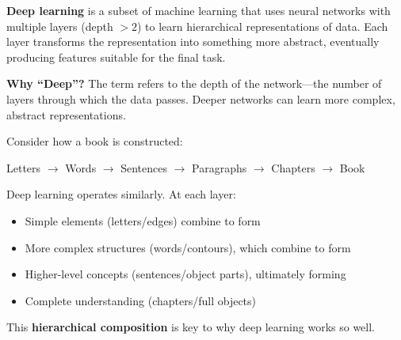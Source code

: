 \begin{center}
\end{center}

\begin{definitionbox}
\textbf{Deep learning} is a subset of machine learning that uses neural networks with multiple layers (depth $> 2$) to learn hierarchical representations of data. Each layer transforms the representation into something more abstract, eventually producing features suitable for the final task.

\textbf{Why ``Deep''?} The term refers to the depth of the network---the number of layers through which the data passes. Deeper networks can learn more complex, abstract representations.
\end{definitionbox}

\begin{bluebox}
Consider how a book is constructed:
\begin{center}
Letters $\rightarrow$ Words $\rightarrow$ Sentences $\rightarrow$ Paragraphs $\rightarrow$ Chapters $\rightarrow$ Book
\end{center}

Deep learning operates similarly. At each layer:
\begin{itemize}
    \item Simple elements (letters/edges) combine to form
    \item More complex structures (words/contours), which combine to form
    \item Higher-level concepts (sentences/object parts), ultimately forming
    \item Complete understanding (chapters/full objects)
\end{itemize}

This \textbf{hierarchical composition} is key to why deep learning works so well.
\end{bluebox}

